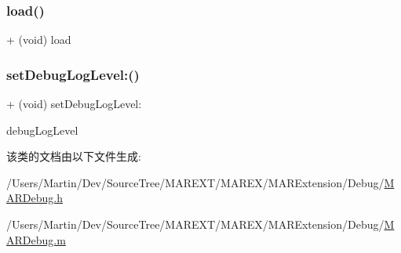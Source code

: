\mbox{\label{interface_m_a_r_debug_a913bf856df48cb6b827c7c7b6ce73499}} 
\subsubsection{\texorpdfstring{load()}{load()}}
{\footnotesize\ttfamily + (void) load \begin{DoxyParamCaption}{ }\end{DoxyParamCaption}\hspace{0.3cm}{\ttfamily [implementation]}}

\mbox{\label{interface_m_a_r_debug_ae31f16a973ddd511bd5edce76a39ee6f}} 
\subsubsection{\texorpdfstring{set\+Debug\+Log\+Level\+:()}{setDebugLogLevel:()}}
{\footnotesize\ttfamily + (void) set\+Debug\+Log\+Level\+: \begin{DoxyParamCaption}\item[{(M\+A\+R\+Debug\+Log\+Level)}]{debug\+Log\+Level }\end{DoxyParamCaption}}



该类的文档由以下文件生成\+:\begin{DoxyCompactItemize}
\item 
/\+Users/\+Martin/\+Dev/\+Source\+Tree/\+M\+A\+R\+E\+X\+T/\+M\+A\+R\+E\+X/\+M\+A\+R\+Extension/\+Debug/\hyperlink{_m_a_r_debug_8h}{M\+A\+R\+Debug.\+h}\item 
/\+Users/\+Martin/\+Dev/\+Source\+Tree/\+M\+A\+R\+E\+X\+T/\+M\+A\+R\+E\+X/\+M\+A\+R\+Extension/\+Debug/\hyperlink{_m_a_r_debug_8m}{M\+A\+R\+Debug.\+m}\end{DoxyCompactItemize}
